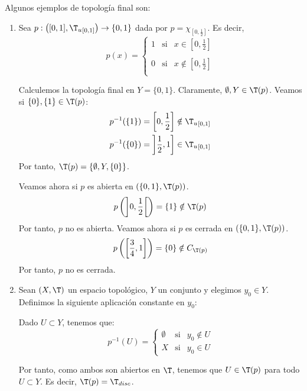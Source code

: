 \begin{ejemplo} Algunos ejemplos de topología final son:
    \begin{enumerate}
        \item Sea $p:\left([0,1],{\T_u}_{[0,1]}\right)\to \{0,1\}$ dada por $p=\chi_{\left[0,\frac{1}{2}\right]}$. Es decir,
        \begin{equation*}
            p(x)=\left\{\begin{array}{ccc}
                1 & \text{si} & x\in \left[0,\frac{1}{2}\right] \\ \\
                0 & \text{si} & x\notin \left[0,\frac{1}{2}\right] \\
            \end{array}\right.
        \end{equation*}

        Calculemos la topología final en $Y=\{0,1\}$. Claramente, $\emptyset, Y\in \T(p)$. Veamos si $\{0\}, \{1\}\in \T(p)$:
        \begin{gather*}
            p^{-1}(\{1\}) = \left[0,\frac{1}{2}\right]\notin {\T_u}_{[0,1]} \\
            p^{-1}(\{0\}) = \left]\frac{1}{2},1\right]\in {\T_u}_{[0,1]}
        \end{gather*}
        Por tanto, $\T(p)=\{\emptyset, Y, \{0\}\}$.

        Veamos ahora si $p$ es abierta en $(\{0,1\}, \T(p))$.
        \begin{equation*}
            p\left(\left]0,\frac{1}{2}\right[\right) = \{1\}\notin \T(p)
        \end{equation*}
        Por tanto, $p$ no es abierta. Veamos ahora si $p$ es cerrada en $(\{0,1\}, \T(p))$.
        \begin{equation*}
            p\left(\left[\frac{3}{4},1\right]\right) = \{0\}\notin C_{\T(p)}
        \end{equation*}
        Por tanto, $p$ no es cerrada.

        \item Sean $(X,\T)$ un espacio topológico, $Y$ un conjunto y elegimos $y_0\in Y$. Definimos la siguiente aplicación constante en $y_0$:

        Dado $U\subset Y$, tenemos que:
        \begin{equation*}
            p^{-1}(U)=\left\{\begin{array}{ccc}
                \emptyset & \text{si} & y_0\notin U \\
                X & \text{si} & y_0\in U
            \end{array}\right.
        \end{equation*}

        Por tanto, como ambos son abiertos en $\T$, tenemos que $U\in \T(p)$ para todo $U\subset Y$. Es decir, $\T(p)=\T_{disc}$.
    \end{enumerate}
\end{ejemplo}

